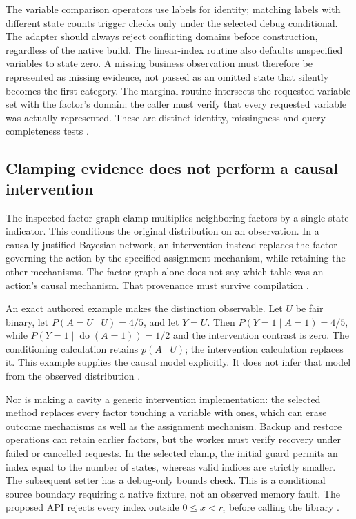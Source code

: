 The variable comparison operators use labels for identity; matching labels
with different state counts trigger checks only under the selected debug
conditional. The adapter should always reject conflicting domains before
construction, regardless of the native build. The linear-index routine also
defaults unspecified variables to state zero. A missing business observation
must therefore be represented as missing evidence, not passed as an omitted
state that silently becomes the first category. The marginal routine
intersects the requested variable set with the factor's domain; the caller
must verify that every requested variable was actually represented. These
are distinct identity, missingness and query-completeness tests
\cite{exec24_libdai_source}.

\subsection{Clamping evidence does not perform a causal intervention}
The inspected factor-graph clamp multiplies neighboring factors by a
single-state indicator. This conditions the original distribution on an
observation. In a causally justified Bayesian network, an intervention
instead replaces the factor governing the action by the specified assignment
mechanism, while retaining the other mechanisms. The factor graph alone
does not say which table was an action's causal mechanism. That provenance
must survive compilation \cite{exec24_libdai_source,exec24_libdai_choice}.

An exact authored example makes the distinction observable. Let $U$ be fair
binary, let $P(A=U\mid U)=4/5$, and let $Y=U$. Then
$P(Y=1\mid A=1)=4/5$, while
$P(Y=1\mid\operatorname{do}(A=1))=1/2$ and the intervention contrast is zero.
The conditioning calculation retains $p(A\mid U)$; the intervention
calculation replaces it. This example supplies the causal model explicitly.
It does not infer that model from the observed distribution
\cite{exec24_libdai_choice}.

Nor is making a cavity a generic intervention implementation: the selected
method replaces every factor touching a variable with ones, which can erase
outcome mechanisms as well as the assignment mechanism. Backup and restore
operations can retain earlier factors, but the worker must verify recovery
under failed or cancelled requests. In the selected clamp, the initial
guard permits an index equal to the number of states, whereas valid indices
are strictly smaller. The subsequent setter has a debug-only bounds check.
This is a conditional source boundary requiring a native fixture, not an
observed memory fault. The proposed API rejects every index outside
$0\leq x<r_i$ before calling the library
\cite{exec24_libdai_source,exec24_libdai_choice}.

